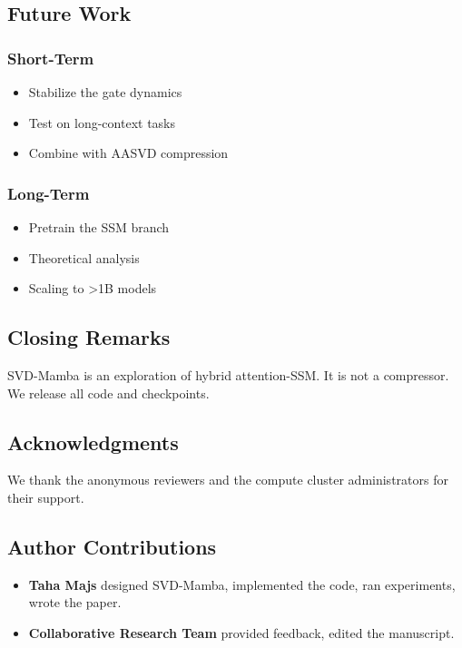 \subsection{Future Work}

\subsubsection{Short-Term}
\begin{itemize}
\item Stabilize the gate dynamics
\item Test on long-context tasks
\item Combine with AASVD compression

\end{itemize}
\subsubsection{Long-Term}
\begin{itemize}
\item Pretrain the SSM branch
\item Theoretical analysis
\item Scaling to >1B models

\end{itemize}
\subsection{Closing Remarks}

SVD-Mamba is an exploration of hybrid attention-SSM. It is not a 
compressor. We release all code and checkpoints.

\subsection{Acknowledgments}

We thank the anonymous reviewers and the compute cluster administrators for their support.

\subsection{Author Contributions}

\begin{itemize}
\item \textbf{Taha Majs} designed SVD-Mamba, implemented the code, ran
  experiments, wrote the paper.
\item \textbf{Collaborative Research Team} provided feedback, edited the manuscript.

\end{itemize}
